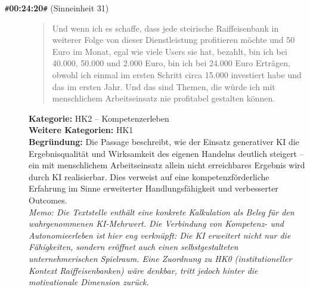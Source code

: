 \begin{description}
  \item[\texttt{\#}\textbf{00:24:20}\texttt{\#} (Sinneinheit 31)]
  \begin{quote}
  Und wenn ich es schaffe, dass jede steirische Raiffeisenbank in weiterer Folge von dieser Dienstleistung profitieren möchte und 50 Euro im Monat, egal wie viele Users sie hat, bezahlt, bin ich bei 40.000, 50.000 und 2.000 Euro, bin ich bei 24.000 Euro Erträgen, obwohl ich einmal im ersten Schritt circa 15.000 investiert habe und das im ersten Jahr. Und das sind Themen, die würde ich mit menschlichem Arbeitseinsatz nie profitabel gestalten können.
  \end{quote}
  \textbf{Kategorie:} HK2 -- Kompetenzerleben\\
  \textbf{Weitere Kategorien:} HK1\\
  \textbf{Begr\"undung:} Die Passage beschreibt, wie der Einsatz generativer KI die Ergebnisqualität und Wirksamkeit des eigenen Handelns deutlich steigert – ein mit menschlichem Arbeitseinsatz allein nicht erreichbares Ergebnis wird durch KI realisierbar. Dies verweist auf eine kompetenzförderliche Erfahrung im Sinne erweiterter Handlungsfähigkeit und verbesserter Outcomes.
  \\\textit{Memo: Die Textstelle enthält eine konkrete Kalkulation als Beleg für den wahrgenommenen KI-Mehrwert. Die Verbindung von Kompetenz- und Autonomieerleben ist hier eng verknüpft: Die KI erweitert nicht nur die Fähigkeiten, sondern eröffnet auch einen selbstgestalteten unternehmerischen Spielraum. Eine Zuordnung zu HK0 (institutioneller Kontext Raiffeisenbanken) wäre denkbar, tritt jedoch hinter die motivationale Dimension zurück.}
\end{description}
\medskip

